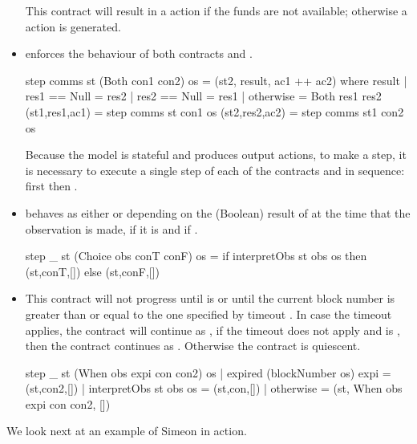 \documentclass[runningheads]{llncs}
\begin{document}
\begin{itemize}
This contract will result in a  action if the funds are not available; otherwise a 
 action is generated.

\medskip
\noindent
\item {} enforces the behaviour of both contracts  and 
. 
\begin{haskellcode}
step comms st (Both con1 con2) os =
    (st2, result, ac1 ++ ac2)
    where
        result | res1 == Null = res2
               | res2 == Null = res1
               | otherwise = Both res1 res2
        (st1,res1,ac1) = step comms st con1 os
        (st2,res2,ac2) = step comms st1 con2 os
\end{haskellcode}
Because the model is stateful and produces output actions, to make a step, it is necessary to execute a single step of 
each of  the contracts  and  in sequence: first  then 
.

\medskip
\noindent
\item {} behaves as either  or  depending on 
the 
(Boolean) result of  at the time that the observation is made,  if it is 
 and  if .

\begin{haskellcode}
step _ st (Choice obs conT conF) os =
    if interpretObs st obs os
        then (st,conT,[])
        else (st,conF,[])
\end{haskellcode}

\medskip
\noindent
\item {} This contract will not progress until  is 
 or until the current block number is greater than or equal to the one specified by timeout 
. In case the timeout applies, the contract will continue as , if the timeout 
does not apply and  is , then the contract continues as . 
Otherwise the contract is quiescent.

\begin{haskellcode}
step _ st (When obs expi con con2) os
  | expired (blockNumber os) expi = (st,con2,[])
  | interpretObs st obs os = (st,con,[])
  | otherwise = (st, When obs expi con con2, [])
  \end{haskellcode}
\end{itemize}
We look next at an example of Simeon in action.
\end{document}
